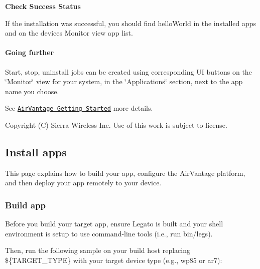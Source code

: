 {\bfseries Check Success Status}

If the installation was successful, you should find hello\+World in the installed apps and on the devices\textquotesingle{} Monitor view app list.\hypertarget{how_to_a_v_install_app_appInstallAirVantage_goingFurther}{}\paragraph{Going further}\label{how_to_a_v_install_app_appInstallAirVantage_goingFurther}
Start, stop, uninstall jobs can be created using corresponding U\+I buttons on the \char`\"{}\+Monitor\char`\"{} view for your system, in the \char`\"{}\+Applications\char`\"{} section, next to the app name you choose.





See \href{https://doc.airvantage.net/display/USERGUIDE/Getting+Started}{\tt Air\+Vantage Getting Started} more details.





Copyright (C) Sierra Wireless Inc. Use of this work is subject to license. \hypertarget{howToAVInstallApp}{}\subsection{Install apps}\label{howToAVInstallApp}
This page explains how to build your app, configure the Air\+Vantage platform, and then deploy your app remotely to your device.\hypertarget{how_to_a_v_install_app_appInstallAirVantage_buildapp}{}\subsubsection{Build app}\label{how_to_a_v_install_app_appInstallAirVantage_buildapp}
Before you build your target app, ensure Legato is built and your shell environment is setup to use command-\/line tools (i.\+e., run {\ttfamily bin/legs}).

Then, run the following sample on your build host replacing {\ttfamily \$\{T\+A\+R\+G\+E\+T\+\_\+\+T\+Y\+P\+E\}} with your target device type (e.\+g., {\ttfamily wp85} or {\ttfamily ar7})\+:



